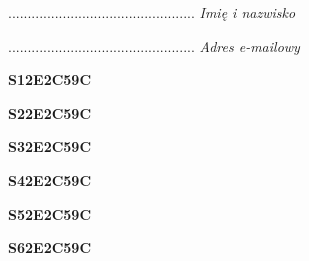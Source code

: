 \begin{turn}{90}\begin{minipage}{\linewidth} \vspace{20mm} ................................................  \textit{Imię i nazwisko}\end{minipage}\end{turn}

\begin{turn}{90}\begin{minipage}{\linewidth} \vspace{20mm} ................................................  \textit{Adres e-mailowy}\end{minipage}\end{turn}

\begin{turn}{90}\huge \begin{minipage}{\linewidth} \vspace{10mm}\textbf{S12E2C59C}\end{minipage}\end{turn}

\begin{turn}{90}\huge \begin{minipage}{\linewidth} \vspace{10mm}\textbf{S22E2C59C}\end{minipage}\end{turn}

\begin{turn}{90}\huge \begin{minipage}{\linewidth} \vspace{10mm}\textbf{S32E2C59C}\end{minipage}\end{turn}

\begin{turn}{90}\huge \begin{minipage}{\linewidth} \vspace{10mm}\textbf{S42E2C59C}\end{minipage}\end{turn}

\begin{turn}{90}\huge \begin{minipage}{\linewidth} \vspace{10mm}\textbf{S52E2C59C}\end{minipage}\end{turn}

\begin{turn}{90}\huge \begin{minipage}{\linewidth} \vspace{10mm}\textbf{S62E2C59C}\end{minipage}\end{turn}

